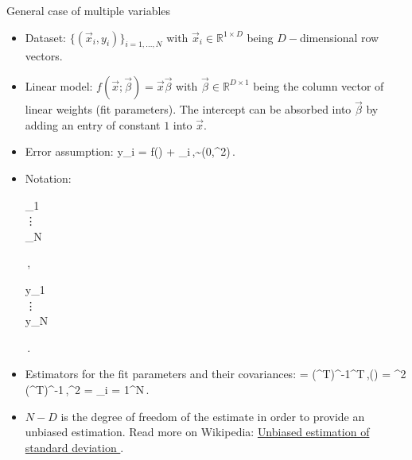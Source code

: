 \documentclass[10pt,aspectratio=169,handout]{beamer}
\begin{document}
\begin{frame}{General case of multiple variables}
	\begin{itemize}[<+->]
		\item Dataset: $\{(\vec{x}_i,y_i)\}_{i=1,...,N}$ with $\vec{x}_i\in\mathbb{R}^{1\times D}$ being $D-$dimensional row vectors.
		\item Linear model: $f(\vec{x};\vec{\beta}) = \vec{x}\vec{\beta}$ with $\vec{\beta}\in\mathbb{R}^{D\times 1}$ being the column vector of linear weights (fit parameters). The intercept can be absorbed into $\vec{\beta}$ by adding an entry of constant $1$ into $\vec{x}$.
		\item Error assumption:
		\bea
			y_i = f() + \varepsilon_i\,,\quad \varepsilon\sim\ncal(0,\sigma^2)\,.
		\eea

		\item Notation:
		\bea
		 \equiv \begin{bmatrix}
			_1 \\
			\vdots \\
			_N
		\end{bmatrix}\,,\quad 
		 \equiv  \begin{bmatrix}
			y_1\\
			\vdots \\
			y_N
		\end{bmatrix}\,.
	\eea
	\item Estimators for the fit parameters and their covariances:
	\bea
		\betahat = (^T)^{-1}^T\,,\quad {}(\betahat) = \sigmahat^2  (^T)^{-1}\,,\quad \sigmahat^2 = \sum_{i = 1}^N\dfrac{\varepsilon_i^2}{N - D}\,.
	\eea
	\item $N-D$ is the degree of freedom of the estimate in order to provide an unbiased estimation. Read more on Wikipedia:  \href{https://en.wikipedia.org/wiki/Unbiased_estimation_of_standard_deviation}{Unbiased estimation of standard deviation
	}.
	\end{itemize}

\end{frame}
\end{document}
